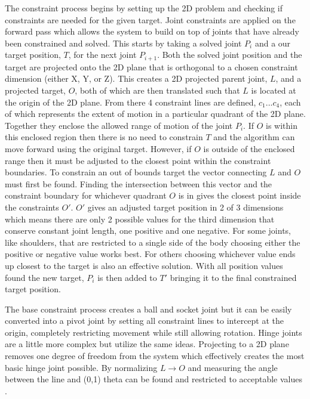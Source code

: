 \documentclass[10pt,twocolumn]{article}
\begin{document}
 The constraint process begins by setting up the 2D problem and checking if constraints are needed for the given target. Joint constraints are applied on the forward pass which allows the system to build on top of joints that have already been constrained and solved. This starts by taking a solved joint $P_i$ and a our target position, $T$, for the next joint $P_{i+1}$. Both the solved joint position and the target are projected onto the 2D plane that is orthogonal to a chosen constraint dimension (either X, Y, or Z). This creates a 2D projected parent joint, $L$, and a projected target, $O$, both of which are then translated such that $L$ is located at the origin of the 2D plane. From there 4 constraint lines are defined, $c_1$...$c_4$, each of which represents the extent of motion in a particular quadrant of the 2D plane. Together they enclose the allowed range of motion of the joint $P_i$. If $O$ is within this enclosed region then there is no need to constrain $T$ and the algorithm can move forward using the original target. However, if $O$ is outside of the enclosed range then it must be adjusted to the closest point within the constraint boundaries. To constrain an out of bounds target the vector connecting $L$ and $O$ must first be found. Finding the intersection between this vector and the constraint boundary for whichever quadrant $O$ is in gives the closest point inside the constraints $O'$. $O'$ gives an adjusted target position in 2 of 3 dimensions which means there are only 2 possible values for the third dimension that conserve constant joint length, one positive and one negative. For some joints, like shoulders, that are restricted to a single side of the body choosing either the positive or negative value works best. For others choosing whichever value ends up closest to the target is also an effective solution. With all position values found the new target, $P_i$ is then added to $T'$ bringing it to the final constrained target position.

 The base constraint process creates a ball and socket joint but it can be easily converted into a pivot joint by setting all constraint lines to intercept at the origin, completely restricting movement while still allowing rotation. Hinge joints are a little more complex but utilize the same ideas. Projecting to a 2D plane removes one degree of freedom from the system which effectively creates the most basic hinge joint possible. By normalizing $L \rightarrow O$ and measuring the angle between the line and (0,1) theta can be found and restricted to acceptable values \cite{extendFABRIK}.
\end{document}
